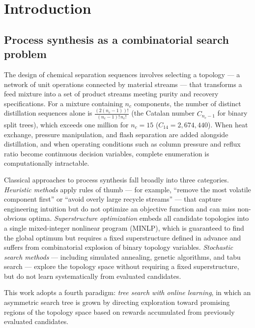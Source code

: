 \documentclass[11pt,a4paper]{article}
\theoremstyle{definition}
\theoremstyle{plain}
\begin{document}
\section{Introduction}
\label{sec:introduction}

\subsection{Process synthesis as a combinatorial search problem}

The design of chemical separation sequences involves selecting a topology — a network of unit operations connected by material streams — that transforms a feed mixture into a set of product streams meeting purity and recovery specifications. For a mixture containing $n_c$ components, the number of distinct distillation sequences alone is $\frac{(2(n_c-1))!}{(n_c-1)!\,n_c!}$ (the Catalan number $C_{n_c-1}$ for binary split trees), which exceeds one million for $n_c = 15$ ($C_{14} = 2{,}674{,}440$). When heat exchange, pressure manipulation, and flash separation are added alongside distillation, and when operating conditions such as column pressure and reflux ratio become continuous decision variables, complete enumeration is computationally intractable.

Classical approaches to process synthesis fall broadly into three categories. \emph{Heuristic methods} apply rules of thumb — for example, ``remove the most volatile component first'' or ``avoid overly large recycle streams'' — that capture engineering intuition but do not optimize an objective function and can miss non-obvious optima. \emph{Superstructure optimization} embeds all candidate topologies into a single mixed-integer nonlinear program (MINLP), which is guaranteed to find the global optimum but requires a fixed superstructure defined in advance and suffers from combinatorial explosion of binary topology variables. \emph{Stochastic search methods} — including simulated annealing, genetic algorithms, and tabu search — explore the topology space without requiring a fixed superstructure, but do not learn systematically from evaluated candidates.

This work adopts a fourth paradigm: \emph{tree search with online learning}, in which an asymmetric search tree is grown by directing exploration toward promising regions of the topology space based on rewards accumulated from previously evaluated candidates.
\end{document}
